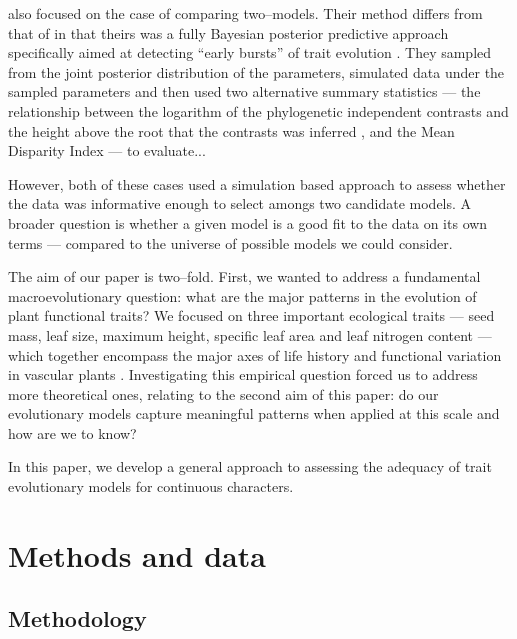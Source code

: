\documentclass[12pt]{article}
\begin{document}
\citet{SlaterPennell} also focused on the case of comparing two--models. Their method differs from that of \citet{Boettiger2012} in that theirs was a fully Bayesian posterior predictive approach specifically aimed at detecting ``early bursts'' of trait evolution \citep[\textit{sensu}][]{Simpson1944, Simpson1953, Harmon2010}. They sampled from the joint posterior distribution of the parameters, simulated data under the sampled parameters and then used two alternative summary statistics --- the relationship between the logarithm of the phylogenetic independent contrasts and the height above the root that the contrasts was inferred \citep[a.k.a. the ``node height test'';][]{FreckletonHarvey2006}, and the Mean Disparity Index \citep[MDI;][]{Harmon2003, Slater2010} --- to evaluate...

However, both of these cases used a simulation based approach to assess whether the data was informative enough to select amongs two candidate models. A broader question is whether a given model is a good fit to the data on its own terms --- compared to the universe of possible models we could consider.

The aim of our paper is two--fold. First, we wanted to address a fundamental macroevolutionary question: what are the major patterns in the evolution of plant functional traits? We focused on three important ecological traits --- seed mass, leaf size, maximum height, specific leaf area and leaf nitrogen content \citep[the latter two being proxies for the ``leaf economic spectrum'', which characterizes the plant's hydrodynamics;][]{Reich1997, Wright2005} --- which together encompass the major axes of life history and functional variation in vascular plants \citep{Cornwell2013}. Investigating this empirical question forced us to address more theoretical ones, relating to the second aim of this paper: do our evolutionary models capture meaningful patterns when applied at this scale and how are we to know?

In this paper, we develop a general approach to assessing the adequacy of trait evolutionary models for continuous characters.

\section{Methods and data}

\subsection{Methodology}
\end{document}
